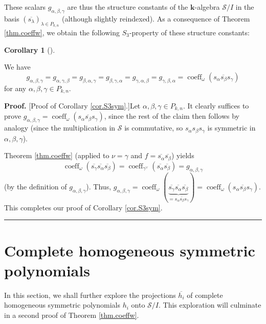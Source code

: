 \documentclass[numbers=enddot,12pt,final,onecolumn,notitlepage]{scrartcl}%
\theoremstyle{definition}
\newtheorem{coro}[theo]{Corollary}
\newenvironment{corollary}[1][]
{\begin{coro}[#1]\begin{leftbar}}
{\end{leftbar}\end{coro}}
\newenvironment{proof}[1][Proof]{\noindent\textbf{#1.} }{\ \rule{0.5em}{0.5em}}
\begin{document}
These scalars $g_{\alpha,\beta,\gamma}$ are thus the structure constants of
the $\mathbf{k}$-algebra $\mathcal{S}/I$ in the basis $\left(  \overline
{s_{\lambda}}\right)  _{\lambda\in P_{k,n}}$ (although slightly reindexed). As
a consequence of Theorem \ref{thm.coeffw}, we obtain the following $S_{3}%
$-property of these structure constants:

\begin{corollary}
\label{cor.S3sym}We have%
\[
g_{\alpha,\beta,\gamma}=g_{\alpha,\gamma,\beta}=g_{\beta,\alpha,\gamma
}=g_{\beta,\gamma,\alpha}=g_{\gamma,\alpha,\beta}=g_{\gamma,\beta,\alpha
}=\operatorname*{coeff}\nolimits_{\omega}\left(  \overline{s_{\alpha}s_{\beta
}s_{\gamma}}\right)
\]
for any $\alpha,\beta,\gamma\in P_{k,n}$.
\end{corollary}

\begin{proof}
[Proof of Corollary \ref{cor.S3sym}.]Let $\alpha,\beta,\gamma\in P_{k,n}$. It
clearly suffices to prove $g_{\alpha,\beta,\gamma}=\operatorname*{coeff}%
\nolimits_{\omega}\left(  \overline{s_{\alpha}s_{\beta}s_{\gamma}}\right)  $,
since the rest of the claim then follows by analogy (since the multiplication
in $\mathcal{S}$ is commutative, so $s_{\alpha}s_{\beta}s_{\gamma}$ is
symmetric in $\alpha,\beta,\gamma$).

Theorem \ref{thm.coeffw} (applied to $\nu=\gamma$ and $f=\overline{s_{\alpha}%
}\overline{s_{\beta}}$) yields%
\[
\operatorname*{coeff}\nolimits_{\omega}\left(  \overline{s_{\gamma}}%
\overline{s_{\alpha}}\overline{s_{\beta}}\right)  =\operatorname*{coeff}%
\nolimits_{\gamma^{\vee}}\left(  \overline{s_{\alpha}}\overline{s_{\beta}%
}\right)  =g_{\alpha,\beta,\gamma}%
\]
(by the definition of $g_{\alpha,\beta,\gamma}$). Thus, $g_{\alpha
,\beta,\gamma}=\operatorname*{coeff}\nolimits_{\omega}\left(
\underbrace{\overline{s_{\gamma}}\overline{s_{\alpha}}\overline{s_{\beta}}%
}_{=\overline{s_{\alpha}s_{\beta}s_{\gamma}}}\right)  =\operatorname*{coeff}%
\nolimits_{\omega}\left(  \overline{s_{\alpha}s_{\beta}s_{\gamma}}\right)  $.
This completes our proof of Corollary \ref{cor.S3sym}.
\end{proof}

\section{\label{sect.redh}Complete homogeneous symmetric polynomials}

In this section, we shall further explore the projections $\overline{h_{i}}$
of complete homogeneous symmetric polynomials $h_{i}$ onto $\mathcal{S}/I$.
This exploration will culminate in a second proof of Theorem \ref{thm.coeffw}.
\end{document}
